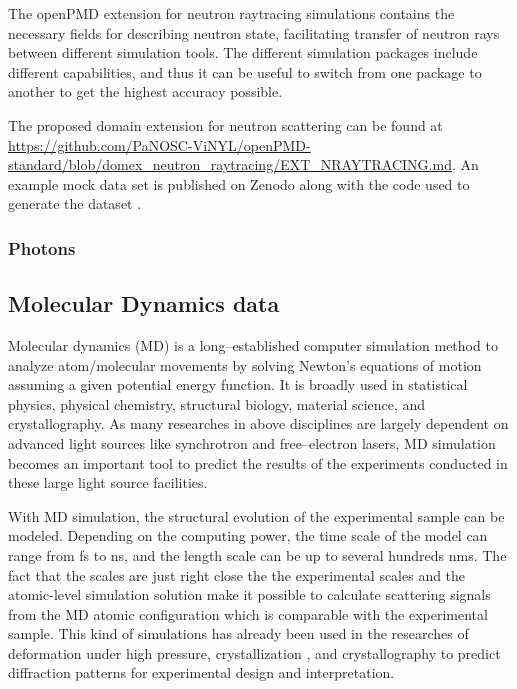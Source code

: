 \documentclass[11pt, a4paper]{article}
\begin{document}
The openPMD extension for neutron raytracing simulations contains the necessary fields for describing neutron state, 
facilitating transfer of neutron rays between different simulation tools. The different simulation packages include different 
capabilities, and thus it can be useful to switch from one package to another to get the highest accuracy possible.

The proposed domain extension for neutron scattering can be found at \url{https://github.com/PaNOSC-ViNYL/openPMD-standard/blob/domex_neutron_raytracing/EXT_NRAYTRACING.md}.
An example mock data set is published on Zenodo along with the code used to generate the dataset \cite{Bertelsen:zenodo2019}.

\subsubsection{Photons}
\subsection{Molecular Dynamics data}
Molecular dynamics (MD) is a long--established computer simulation method to analyze atom/molecular movements by solving Newton's
equations of motion assuming a given potential energy function. It is broadly used in statistical physics, physical chemistry,
structural biology, material science, and crystallography. As many researches in above disciplines are largely dependent
on advanced light sources like synchrotron and free--electron lasers, MD simulation becomes an important tool to predict the 
results of the experiments conducted in these large light source facilities.

With MD simulation, the structural evolution of the experimental sample can be modeled. Depending on the computing power, the time scale 
of the model can range from fs to ns, and the length scale can be up to several hundreds nms. The fact that the scales are 
just right close the the experimental scales and the atomic-level simulation solution make it possible to calculate 
scattering signals from the MD atomic configuration which is comparable with the experimental sample. This kind of simulations has already
been used in the researches of deformation under high pressure\cite{kimminau2008jpcm,tang2017jap,tang2018jsr,zhang2019jsr}, 
crystallization \cite{e2015}, and crystallography \cite{coleman2013msmse} to predict diffraction patterns for experimental design
and interpretation.
\end{document}
